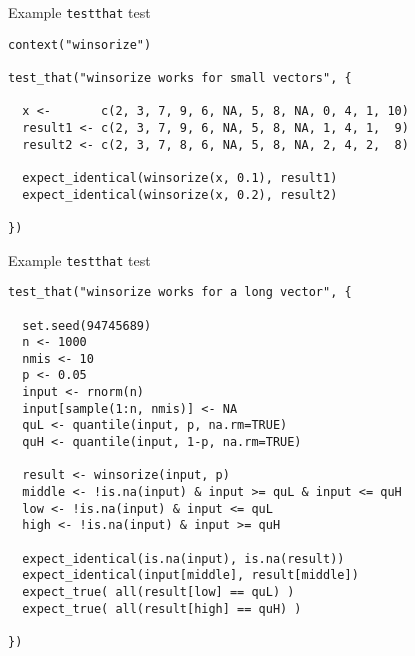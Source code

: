 \documentclass[12pt,t]{beamer}
\begin{document}
\begin{frame}[c,fragile]{Example {\tt testthat} test}


\begin{lstlisting}
context("winsorize")

test_that("winsorize works for small vectors", {

  x <-       c(2, 3, 7, 9, 6, NA, 5, 8, NA, 0, 4, 1, 10)
  result1 <- c(2, 3, 7, 9, 6, NA, 5, 8, NA, 1, 4, 1,  9)
  result2 <- c(2, 3, 7, 8, 6, NA, 5, 8, NA, 2, 4, 2,  8)

  expect_identical(winsorize(x, 0.1), result1)
  expect_identical(winsorize(x, 0.2), result2)

})
\end{lstlisting}



\end{frame}


\begin{frame}[c,fragile]{Example {\tt testthat} test}


\begin{lstlisting}
test_that("winsorize works for a long vector", {

  set.seed(94745689)
  n <- 1000
  nmis <- 10
  p <- 0.05
  input <- rnorm(n)
  input[sample(1:n, nmis)] <- NA
  quL <- quantile(input, p, na.rm=TRUE)
  quH <- quantile(input, 1-p, na.rm=TRUE)

  result <- winsorize(input, p)
  middle <- !is.na(input) & input >= quL & input <= quH
  low <- !is.na(input) & input <= quL
  high <- !is.na(input) & input >= quH

  expect_identical(is.na(input), is.na(result))
  expect_identical(input[middle], result[middle])
  expect_true( all(result[low] == quL) )
  expect_true( all(result[high] == quH) )

})
\end{lstlisting}



\end{frame}
\end{document}
